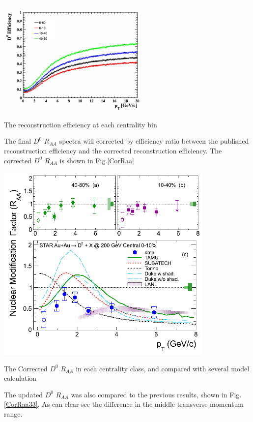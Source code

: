 \bfg \centering
\includegraphics[width=0.6\textwidth]{figure/Run11_YF/rec_eff.png}
\caption{The reconstruction efficiency at each centrality bin}
\label{RecEff}
\efg



The final $D^0$ $R_{AA}$ spectra will corrected by efficiency ratio between the published reconstruction efficiency and the corrected reconstruction efficiency. The  corrected $D^0$ $R_{AA}$ is  shown in Fig.\ref{CorRaa}

\bfg \centering
\includegraphics[width=0.8\textwidth]{figure/Run11_YF/fig3.png}
\caption{The Corrected $D^0$ $R_{AA}$ in each centrality class, and compared with several model calculation }
\label{CorRaa}
\efg

The updated $D^0$ $R_{AA}$ was also compared to the previous results, shown in Fig.\ref{CorRaa33}. As can clear see the difference in the middle transverse momentum range.

